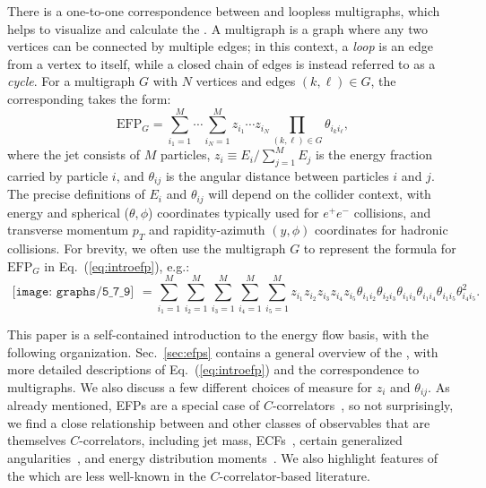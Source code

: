 \documentclass[letterpaper,11pt]{article}
\DeclareRobustCommand{\Sec}[1]{Sec.~\ref{#1}}
\DeclareRobustCommand{\Eq}[1]{Eq.~(\ref{#1})}
\newcommand{\B}{\text{EFP}\xspace}
\newcommand{\Bs}{\text{EFPs}\xspace}
\begin{document}
There is a one-to-one correspondence between \Bs and loopless multigraphs, which helps to visualize and calculate the \Bs.
%
A multigraph is a graph where any two vertices can be connected by multiple edges; in this context, a \emph{loop} is an edge from a vertex to itself, while a closed chain of edges is instead referred to as a \emph{cycle}.
%
For a multigraph $G$ with $N$ vertices and edges $(k,\ell)\in G$, the corresponding \B takes the form:
%
\begin{equation}\label{eq:introefp}
\B_{G} = \sum_{i_1=1}^M\cdots\sum_{i_N=1}^M z_{i_1}\cdots z_{i_N}\prod_{(k,\ell) \in G} \theta_{i_k i_\ell},
\end{equation}
%
where the jet consists of $M$ particles, $z_i \equiv E_i/\sum_{j=1}^M E_j$ is the energy fraction carried by particle $i$, and $\theta_{ij}$ is the angular distance between particles $i$ and $j$.
%
The precise definitions of $E_i$ and $\theta_{ij}$ will depend on the collider context, with energy and spherical ($\theta,\phi$) coordinates typically used for $e^+e^-$ collisions, and transverse momentum $p_T$ and rapidity-azimuth $(y,\phi)$ coordinates for hadronic collisions.
%
For brevity, we often use the multigraph $G$ to represent the formula for $\B_G$ in \Eq{eq:introefp}, e.g.:
%
\begin{equation}\label{eq:wedgegraphex}
\begin{gathered}
\texttt{[image: graphs/5\_7\_9]}
\end{gathered}
= \sum_{i_1=1}^M\sum_{i_2 = 1}^M \sum_{i_3 = 1}^M \sum_{i_4=1}^M\sum_{i_5=1}^M  z_{i_1} z_{i_2} z_{i_3}z_{i_4}z_{i_5}\theta_{i_1i_2} \theta_{i_2i_3}\theta_{i_1i_3}\theta_{i_1i_4}\theta_{i_1i_5}\theta_{i_4i_5}^2.
\end{equation}

This paper is a self-contained introduction to the energy flow basis, with the following organization.
%
\Sec{sec:efps} contains a general overview of the \Bs, with more detailed descriptions of \Eq{eq:introefp} and the correspondence to multigraphs.
%
We also discuss a few different choices of measure for $z_i$ and $\theta_{ij}$.
%
As already mentioned, EFPs are a special case of $C$-correlators~\cite{Tkachov:1995kk}, so not surprisingly, we find a close relationship between \Bs and other classes of observables that are themselves $C$-correlators, including jet mass, ECFs~\cite{Larkoski:2013eya}, certain generalized angularities~\cite{Larkoski:2014pca}, and energy distribution moments~\cite{GurAri:2011vx}.
%
We also highlight features of the \Bs which are less well-known in the $C$-correlator-based literature.
 
\end{document}
